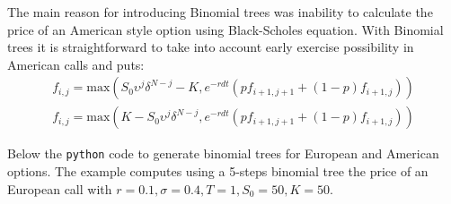 The main reason for introducing Binomial trees was inability to calculate the price of an American style option using Black-Scholes equation. With Binomial trees it is straightforward to take into account early exercise possibility in American calls and puts:
\begin{equation}
\begin{gathered}
f_{i,j} = \textrm{max}\left(S_0 \upsilon^{j} \delta^{N-j} - K, e^{-rdt}\left(pf_{i+1,j+1} + (1-p)f_{i+1,j}\right)\right) \\
f_{i,j} = \textrm{max}\left(K - S_0 \upsilon^{j} \delta^{N-j}, e^{-rdt}\left(pf_{i+1,j+1} + (1-p)f_{i+1,j}\right)\right)
\end{gathered}
\end{equation}

Below the \texttt{python} code to generate binomial trees for European and American options.
The example computes using a 5-steps binomial tree the price of an European call with $r=0.1, \sigma=0.4, T=1, S_0=50, K=50$.

